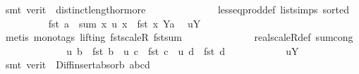 \begin{isabellebody}
\ {\isacharparenleft}{\kern0pt}smt\ {\isacharparenleft}{\kern0pt}verit{\isacharparenright}{\kern0pt}\ \ distinct{\isacharunderscore}{\kern0pt}length{\isacharunderscore}{\kern0pt}{}{\isacharunderscore}{\kern0pt}or{\isacharunderscore}{\kern0pt}more\isanewline
\ \ \ \ \ \ \ \ \ \ \ \ \ \ less{\isacharunderscore}{\kern0pt}eq{\isacharunderscore}{\kern0pt}prod{\isacharunderscore}{\kern0pt}def\ list{\isachardot}{\kern0pt}simps{\isacharparenleft}{\kern0pt}{}{\isacharparenright}{\kern0pt}\ sorted{}{\isacharparenright}{\kern0pt}{\isacharplus}{\kern0pt}\isanewline
\ \ \ \ \ \ \ \ \isamarkupfalse%
\ {\isachardoublequoteopen}fst\ a\ {\isacharequal}{\kern0pt}\ sum\ {\isacharparenleft}{\kern0pt}{\isasymlambda}x{\isachardot}{\kern0pt}\ u\ x\ {\isacharasterisk}{\kern0pt}\ {\isacharparenleft}{\kern0pt}fst\ x{\isacharparenright}{\kern0pt}{\isacharparenright}{\kern0pt}\ {\isacharparenleft}{\kern0pt}Y{\isacharminus}{\kern0pt}{\isacharbraceleft}{\kern0pt}a{\isacharbraceright}{\kern0pt}{\isacharparenright}{\kern0pt}{\isachardoublequoteclose}\ \isamarkupfalse%
\ uY\isanewline
\ \ \ \ \ \ \ \ \ \ \isamarkupfalse%
\ {\isacharparenleft}{\kern0pt}metis\ {\isacharparenleft}{\kern0pt}mono{\isacharunderscore}{\kern0pt}tags{\isacharcomma}{\kern0pt}\ lifting{\isacharparenright}{\kern0pt}\ fst{\isacharunderscore}{\kern0pt}scaleR\ fst{\isacharunderscore}{\kern0pt}sum\isanewline
\ \ \ \ \ \ \ \ \ \ \ \ \ \ real{\isacharunderscore}{\kern0pt}scaleR{\isacharunderscore}{\kern0pt}def\ sum{\isachardot}{\kern0pt}cong{\isacharparenright}{\kern0pt}\isanewline
\ \ \ \ \ \ \ \ \isamarkupfalse%
\ \isamarkupfalse%
\ {\isachardoublequoteopen}{\isachardot}{\kern0pt}{\isachardot}{\kern0pt}{\isachardot}{\kern0pt}\ {\isacharequal}{\kern0pt}\ u\ b\ {\isacharasterisk}{\kern0pt}\ {\isacharparenleft}{\kern0pt}fst\ b{\isacharparenright}{\kern0pt}\ {\isacharplus}{\kern0pt}\ u\ c\ {\isacharasterisk}{\kern0pt}\ {\isacharparenleft}{\kern0pt}fst\ c{\isacharparenright}{\kern0pt}\ {\isacharplus}{\kern0pt}\ u\ d\ {\isacharasterisk}{\kern0pt}\ {\isacharparenleft}{\kern0pt}fst\ d{\isacharparenright}{\kern0pt}{\isachardoublequoteclose}\isanewline
\ \ \ \ \ \ \ \ \ \ \isamarkupfalse%
\ uY\isanewline
\ \ \ \ \ \ \ \ \ \ \isamarkupfalse%
\ {\isacharparenleft}{\kern0pt}smt\ {\isacharparenleft}{\kern0pt}verit{\isacharparenright}{\kern0pt}\ {\isachardoublequoteopen}{}{}{\isachardoublequoteclose}\ Diff{\isacharunderscore}{\kern0pt}insert{\isacharunderscore}{\kern0pt}absorb\ abcd\isanewline

\end{isabellebody}
